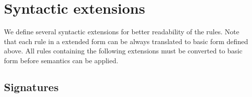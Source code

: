 \documentclass{entcs}
\renewcommand{\~}[0]{\texttildelow}
\begin{document}








\section{Syntactic extensions}

We define several syntactic extensions for better readability of the rules. Note that each rule in a extended form can be always translated to basic form defined above. All rules containing the following extensions must be converted to basic form before semantics can be applied.

\subsection{Signatures}
\end{document}
